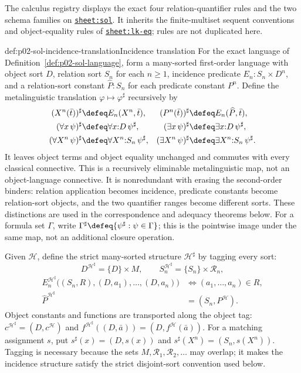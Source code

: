 The calculus registry displays the exact four relation-quantifier rules and
the two schema families on
\hyperref[sheet:sol]{\texttt{sheet:sol}}.  It inherits the finite-multiset
sequent conventions and object-equality rules of
\hyperref[sheet:lk-eq]{\texttt{sheet:lk-eq}}; rules are not duplicated here.

\begin{hbdefinition}{def:p02-sol-incidence-translation}{Incidence translation}
For the exact language of Definition~\ref{def:p02-sol-language}, form a
many-sorted first-order language with object sort \(D\), relation sort
\(S_n\) for each \(n\geq1\), incidence predicate
\(E_n:S_n\times D^n\), and a relation-sort constant \(\widehat P:S_n\) for
each predicate constant \(P^n\).  Define the metalinguistic translation
\(\varphi\mapsto\varphi^\sharp\) recursively by
\[
\begin{aligned}
 (X^n(\bar t))^\sharp&\defeq E_n(X^n,\bar t),
 & (P^n(\bar t))^\sharp&\defeq E_n(\widehat P,\bar t),\\
 (\forall x\,\psi)^\sharp&\defeq\forall x{:}D\,\psi^\sharp,
 & (\exists x\,\psi)^\sharp&\defeq\exists x{:}D\,\psi^\sharp,\\
 (\forall X^n\,\psi)^\sharp&\defeq\forall X^n{:}S_n\,\psi^\sharp,
 & (\exists X^n\,\psi)^\sharp&\defeq\exists X^n{:}S_n\,\psi^\sharp.
\end{aligned}
\]
It leaves object terms and object equality unchanged and commutes with every
classical connective.  This is a recursively eliminable metalinguistic map,
not an object-language connective.  It is nonredundant with erasing the
second-order binders: relation application becomes incidence, predicate
constants become relation-sort objects, and the two quantifier ranges become
different sorts.  These distinctions are used in the correspondence and
adequacy theorems below.
For a formula set \(\Gamma\), write
\(\Gamma^\sharp\defeq\{\psi^\sharp:\psi\in\Gamma\}\); this is the
pointwise image under the same map, not an additional closure operation.
\end{hbdefinition}

Given \(\mathcal H\), define the strict many-sorted structure
\(\mathcal H^\sharp\) by tagging every sort:
\[
 D^{\mathcal H^\sharp}=\{D\}\times M,
 \qquad S_n^{\mathcal H^\sharp}=\{S_n\}\times\mathcal R_n,
\]
\[
\begin{aligned}
 E_n^{\mathcal H^\sharp}
   \bigl((S_n,R),(D,a_1),\ldots,(D,a_n)\bigr)
 &\Longleftrightarrow(a_1,\ldots,a_n)\in R,\\
 \widehat P^{\mathcal H^\sharp}
 &= (S_n,P^{\mathcal H}).
\end{aligned}
\]
Object constants and functions are transported along the object tag:
\(c^{\mathcal H^\sharp}=(D,c^{\mathcal H})\) and
\(f^{\mathcal H^\sharp}((D,\bar a))=(D,f^{\mathcal H}(\bar a))\).
For a matching assignment \(s\), put \(s^\sharp(x)=(D,s(x))\) and
\(s^\sharp(X^n)=(S_n,s(X^n))\).  Tagging is necessary because the sets
\(M,\mathcal R_1,\mathcal R_2,\ldots\) may overlap; it makes the incidence
structure satisfy the strict disjoint-sort convention used below.

